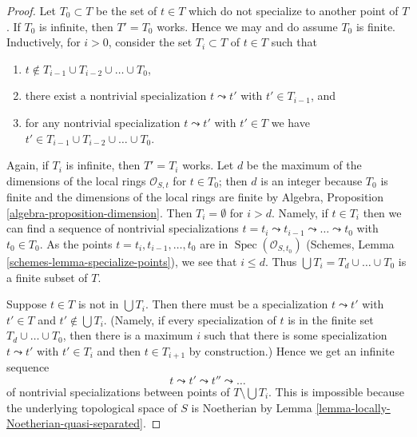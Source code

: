 \documentclass[10pt,a4paper]{amsart}
\theoremstyle{plain}
\theoremstyle{definition}
\theoremstyle{remark}
\numberwithin{equation}{subsection}
\def\Spec{\mathop{\mathrm{Spec}}}
\begin{document}
\begin{proof}
Let $T_0 \subset T$ be the set of $t \in T$ which do not specialize
to another point of $T$. If $T_0$ is infinite, then $T' = T_0$ works.
Hence we may and do assume $T_0$ is finite.
Inductively, for $i > 0$, consider the set $T_i \subset T$
of $t \in T$ such that
\begin{enumerate}
\item $t \not \in T_{i - 1} \cup T_{i - 2} \cup \ldots \cup T_0$,
\item there exist a nontrivial specialization $t \leadsto t'$ with
$t' \in T_{i - 1}$, and
\item for any nontrivial specialization
$t \leadsto t'$ with $t' \in T$ we have
$t' \in T_{i - 1} \cup T_{i - 2} \cup \ldots \cup T_0$.
\end{enumerate}
Again, if $T_i$ is infinite, then $T' = T_i$ works.
Let $d$ be the maximum of the dimensions of the local rings
$\mathcal{O}_{S, t}$ for $t \in T_0$; then $d$ is an integer
because $T_0$ is finite and the dimensions of the local rings
are finite by Algebra, Proposition \ref{algebra-proposition-dimension}.
Then $T_i = \emptyset$ for $i > d$.
Namely, if $t \in T_i$ then we can find a sequence
of nontrivial specializations
$t = t_i \leadsto t_{i - 1} \leadsto \ldots \leadsto t_0$
with $t_0 \in T_0$. As
the points $t = t_i, t_{i - 1}, \ldots, t_0$ are in
$\Spec(\mathcal{O}_{S, t_0})$
(Schemes, Lemma \ref{schemes-lemma-specialize-points}),
we see that $i \leq d$.
Thus $\bigcup T_i = T_d \cup \ldots \cup T_0$ is a finite subset of $T$.

\medskip\noindent
Suppose $t \in T$ is not in $\bigcup T_i$. Then there must be a specialization
$t \leadsto t'$ with $t' \in T$ and $t' \not \in \bigcup T_i$. (Namely, if
every specialization of $t$ is in the finite set $T_d \cup \ldots \cup T_0$,
then there is a maximum $i$ such that there is some specialization
$t \leadsto t'$ with $t' \in T_i$ and then $t \in T_{i + 1}$ by construction.)
Hence we get an infinite sequence
$$
t \leadsto t' \leadsto t'' \leadsto \ldots
$$
of nontrivial specializations between points of $T \setminus \bigcup T_i$.
This is impossible because the underlying topological space of $S$
is Noetherian by Lemma \ref{lemma-locally-Noetherian-quasi-separated}.
\end{proof}
\end{document}
